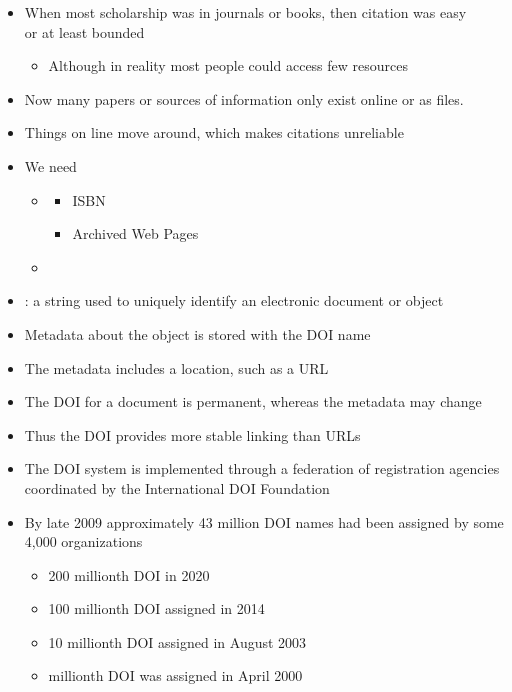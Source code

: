 \documentclass[a4paper,landscape,headrule,footrule,xetex]{foils}
\begin{document}


\begin{itemize}
\item When most scholarship was in journals or books, then citation was easy
\\ or at least bounded 
\begin{itemize}
\item[\Bad] Although in reality most people could access few resources
\end{itemize}
\item Now many papers or sources of information only exist online or as files.
\item Things on line move around, which makes citations unreliable
\item We need 
  \begin{itemize}
  \item {}
    \begin{itemize}
    \item ISBN
    \item Archived Web Pages
    \end{itemize}
  \item {}
  \end{itemize}
\end{itemize}

\begin{itemize}
\item {}: a string used to uniquely identify an electronic document or object
\item Metadata  about the object is stored with the DOI name
\item The metadata includes a location, such as a URL
\item The DOI for a document is permanent, whereas the metadata may change
\item Thus the DOI provides more stable linking than URLs
\item  The DOI system is implemented through a federation of registration agencies coordinated by the International DOI Foundation
\item By late 2009 approximately 43 million DOI names had been assigned by some 4,000 organizations
  \begin{itemize}
    \item 200 millionth DOI in 2020
  \item 100 millionth DOI assigned in 2014
  \item  10 millionth DOI  assigned in August 2003
  \item  millionth DOI was assigned in April 2000
  \end{itemize}
\end{itemize}
\end{document}
